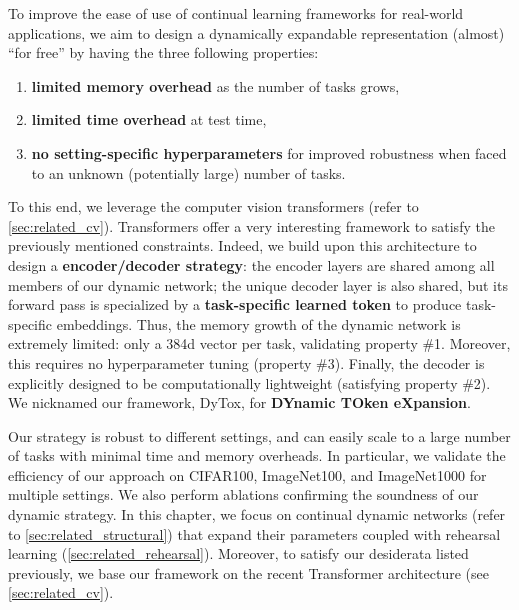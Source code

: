 To improve the ease of use of continual learning frameworks for real-world applications, we aim to
design a dynamically expandable representation (almost) ``for free'' by having the three following
properties:

\begin{enumerate}
    \item \textbf{limited memory overhead} as the number of tasks grows,
    \item \textbf{limited time overhead} at test time,
    \item \textbf{no setting-specific hyperparameters} for improved robustness when faced to an unknown
          (potentially large) number of tasks.
\end{enumerate}


To this end, we leverage the computer vision transformers (refer to \autoref{sec:related_cv}).
Transformers \citep{vaswani2017transformer} offer a very interesting framework to satisfy the
previously mentioned constraints. Indeed, we build upon this architecture to design a
\textbf{encoder/decoder strategy}: the encoder layers are shared among all members of our dynamic
network; the unique decoder layer is also shared, but its forward pass is specialized by a
\textbf{task-specific learned token} to produce task-specific embeddings. Thus, the memory growth of
the dynamic network is extremely limited: only a 384d vector per task, validating property \#1.
Moreover, this requires no hyperparameter tuning (property \#3). Finally, the decoder is explicitly
designed to be computationally lightweight (satisfying property \#2). We nicknamed our framework,
DyTox, for \textbf{DYnamic TOken eXpansion}.

Our strategy is robust to different settings, and can easily scale to a large number of tasks with
minimal time and memory overheads. In particular, we validate the efficiency of our approach on
CIFAR100, ImageNet100, and ImageNet1000 for multiple settings. We also perform ablations confirming
the soundness of our dynamic strategy. In this chapter, we focus on continual dynamic networks
(refer to \autoref{sec:related_structural}) that expand their parameters coupled with rehearsal
learning (\autoref{sec:related_rehearsal}). Moreover, to satisfy our desiderata listed previously,
we base our framework on the recent Transformer architecture (see \autoref{sec:related_cv}).

